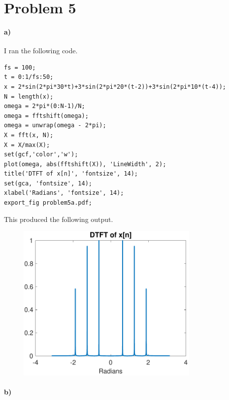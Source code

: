 \documentclass[12pt]{article}
\begin{document}
\pagebreak

\section*{Problem 5}

\paragraph{a)}

I ran the following code.
\begin{verbatim}
fs = 100;
t = 0:1/fs:50;
x = 2*sin(2*pi*30*t)+3*sin(2*pi*20*(t-2))+3*sin(2*pi*10*(t-4));
N = length(x);
omega = 2*pi*(0:N-1)/N;
omega = fftshift(omega);
omega = unwrap(omega - 2*pi);
X = fft(x, N);
X = X/max(X);
set(gcf,'color','w');
plot(omega, abs(fftshift(X)), 'LineWidth', 2);
title('DTFT of x[n]', 'fontsize', 14);
set(gca, 'fontsize', 14);
xlabel('Radians', 'fontsize', 14);
export_fig problem5a.pdf;
\end{verbatim}
This produced the following output.
\begin{figure}[H]
    \begin{center}
        \includegraphics[width=3.5in]{problem5a.pdf}
    \end{center}
\end{figure}

\paragraph{b)}
\end{document}
